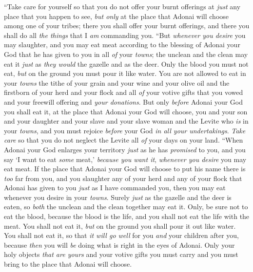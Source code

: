 \begin{biblechapter}
\verse “Take care for yourself so that you do not offer your burnt offerings at \textit{just} any place that you happen to see,
\verse \textit{but only} at the place that Adonai will choose among one of your tribes; there you shall offer your burnt offerings, and there you shall do all \textit{the things} that I \textit{am} commanding you.
\verse “But \textit{whenever you desire} you may slaughter, and you may eat meat according to the blessing of Adonai your God that he has given to you in all \textit{of} your \textit{towns}; the unclean and the clean may eat it \textit{just} as \textit{they would} the gazelle and as the deer.
\verse Only the blood you must not eat, \textit{but} on the ground you must pour it like water.
\verse You are not allowed to eat in your \textit{towns} the tithe of your grain and your wine and your olive oil and the firstborn of your herd and your flock and all \textit{of} your votive gifts that you vowed and your freewill offering and \textit{your donations}.
\verse But only \textit{before} Adonai your God you shall eat it, at the place that Adonai your God will choose, you and your son and your daughter and your slave and your slave woman and the Levite who \textit{is} in your \textit{towns}, and you must rejoice \textit{before} your God \textit{in all your undertakings}.
\verse \textit{Take care} so that you do not neglect the Levite all \textit{of} your days on your land.
\verse “When Adonai your God enlarges your territory \textit{just} as he has \textit{promised} to you, and you say ‘I want to eat \textit{some} meat,’ \textit{because you want it}, \textit{whenever you desire} you may eat meat.
\verse If the place that Adonai your God will choose to put his name there is \textit{too} far from you, and you slaughter any of your herd and any of your flock that Adonai has given to you \textit{just} as I have commanded you, then you may eat whenever you desire in your \textit{towns}.
\verse Surely \textit{just} as the gazelle and the deer is eaten, so \textit{both} the unclean and the clean together may eat it.
\verse Only, be sure not to eat the blood, because the blood is the life, and you shall not eat the life with the meat.
\verse You shall not eat it, \textit{but} on the ground you shall pour it out like water.
\verse You shall not eat it, so that \textit{it will go well} for you \textit{and} your children after you, because \textit{then} you will \textit{be} doing what is right in the eyes of Adonai.
\verse Only your holy objects \textit{that are yours} and your votive gifts you must carry and you must bring to the place that Adonai will choose.

\end{biblechapter}
